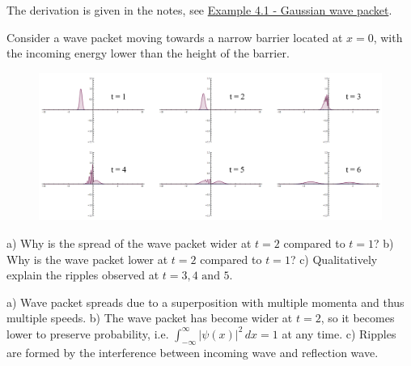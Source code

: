 \documentclass[12pt]{book} %
\numberwithin{equation}{chapter}
\begin{document}
\begin{solbox}
The derivation is given in the notes, see \hyperref[Gaussian wave packet]{Example 4.1 - Gaussian wave packet}.
\end{solbox}

\begin{problem}
Consider a wave packet moving towards a narrow barrier located at $x=0$, with the incoming energy lower than the height of the barrier.
\begin{figure}[H]
\centering
\includegraphics[width=\textwidth]{Scattering of a wave packet}
\end{figure}
\noindent a) Why is the spread of the wave packet wider at $t=2$ compared to $t=1$?\bigskip\newline
b) Why is the wave packet lower at $t=2$ compared to $t=1$?\bigskip\newline
c) Qualitatively explain the ripples observed at $t=3, 4\text{ and }5$.
\end{problem}

\begin{solbox}
a) Wave packet spreads due to a superposition with multiple momenta and thus multiple speeds.\bigskip\newline
b) The wave packet has become wider at $t=2$, so it becomes lower to preserve probability, i.e. $\int_{-\infty}^{\infty}{\left|\psi(x)\right|}^{2}\,dx=1$ at any time.\bigskip\newline
c) Ripples are formed by the interference between incoming wave and reflection wave.
\end{solbox}
\end{document}
